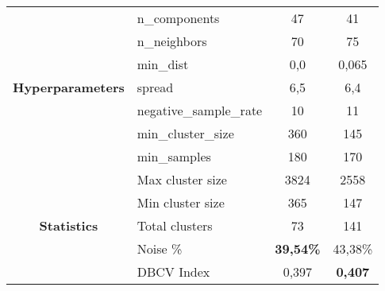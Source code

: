 \begin{table}[!htbp]
\begin{longtable}[c]{|cl|cc|}
    \multicolumn{1}{|c|}{\multirow{7}{*}{\textbf{Hyperparameters}}} & n\_components            & \multicolumn{1}{c|}{47}                & \multicolumn{1}{c|}{41}             \\
    \multicolumn{1}{|c|}{}                                          & n\_neighbors             & \multicolumn{1}{c|}{70}                & \multicolumn{1}{c|}{75}             \\
    \multicolumn{1}{|c|}{}                                          & min\_dist                & \multicolumn{1}{c|}{0,0}               & \multicolumn{1}{c|}{0,065}          \\
    \multicolumn{1}{|c|}{}                                          & spread                   & \multicolumn{1}{c|}{6,5}               & \multicolumn{1}{c|}{6,4}            \\
    \multicolumn{1}{|c|}{}                                          & negative\_sample\_rate   & \multicolumn{1}{c|}{10}                & \multicolumn{1}{c|}{11}             \\
    \multicolumn{1}{|c|}{}                                          & min\_cluster\_size       & \multicolumn{1}{c|}{360}               & \multicolumn{1}{c|}{145}            \\
    \multicolumn{1}{|c|}{}                                          & min\_samples             & \multicolumn{1}{c|}{180}               & \multicolumn{1}{c|}{170}            \\ \hline
    \multicolumn{1}{|c|}{\multirow{5}{*}{\textbf{Statistics}}}      & Max cluster size         & \multicolumn{1}{c|}{3824}              & \multicolumn{1}{c|}{2558}           \\
    \multicolumn{1}{|c|}{}                                          & Min cluster size         & \multicolumn{1}{c|}{365}               & \multicolumn{1}{c|}{147}            \\
    \multicolumn{1}{|c|}{}                                          & Total clusters           & \multicolumn{1}{c|}{73}                & \multicolumn{1}{c|}{141}            \\
    \multicolumn{1}{|c|}{}                                          & Noise \%                 & \multicolumn{1}{c|}{\textbf{39,54\%}}  & \multicolumn{1}{c|}{43,38\%}        \\
    \multicolumn{1}{|c|}{}                                          & DBCV Index               & \multicolumn{1}{c|}{0,397}             & \multicolumn{1}{c|}{\textbf{0,407}} \\ \hline
\end{longtable}
\end{table}